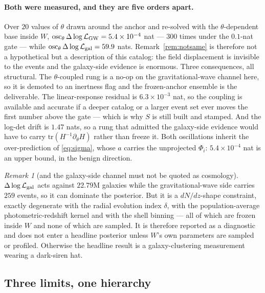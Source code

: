 \documentclass[11pt]{article}
\theoremstyle{definition}
\theoremstyle{remark}
\newtheorem{remark}{Remark}
\newcommand{\osc}{\mathop{\mathrm{osc}}}
\newcommand{\tr}{\mathrm{tr}}
\begin{document}
\paragraph{Both were measured, and they are five orders apart.} Over $20$ values
of $\theta$ drawn around the anchor and re-solved with the $\theta$-dependent base
inside $W$, $\osc_\theta\Delta\log\mathcal L_{\rm GW}=5.4\times10^{-4}$ nat ---
$300$ times under the $0.1$-nat gate --- while
$\osc_\theta\Delta\log\mathcal L_{\rm gal}=59.9$ nats. Remark~\ref{rem:notsame} is
therefore not a hypothetical but a description of this catalog: the field
displacement is invisible to the events and the galaxy-side evidence is enormous.
Three consequences, all structural. The $\theta$-coupled rung is a no-op on the
gravitational-wave channel here, so it is demoted to an inertness flag and the
frozen-anchor ensemble is the deliverable. The linear-response residual is
$6.3\times10^{-3}$ nat, so the coupling is available and accurate if a deeper
catalog or a larger event set ever moves the first number above the gate --- which
is why $S$ is still built and stamped. And the log-det drift is $1.47$ nats, so a
rung that admitted the galaxy-side evidence would have to carry
$\tr(H^{-1}\partial_\theta H)$ rather than freeze it. Both oscillations inherit
the over-prediction of \eqref{eq:sigma}, whose $a$ carries the unprojected
$\Phi_i$: $5.4\times10^{-4}$ nat is an upper bound, in the benign direction.

\begin{remark}[and the galaxy-side channel must not be quoted as cosmology]
\label{rem:effectA}
$\Delta\log\mathcal L_{\rm gal}$ acts against $22.79$M galaxies while the
gravitational-wave side carries $259$ events, so it can dominate the posterior. But
it is a $dN/dz$-shape constraint, exactly degenerate with the radial evolution index
$\delta$, with the population-average photometric-redshift kernel and with the shell
binning --- all of which are frozen inside $W$ and none of which are sampled. It is
therefore reported as a diagnostic and does not enter a headline posterior unless
$W$'s own parameters are sampled or profiled. Otherwise the headline result is a
galaxy-clustering measurement wearing a dark-siren hat.
\end{remark}

\subsection{Three limits, one hierarchy}
\label{sec:limits}
\end{document}
